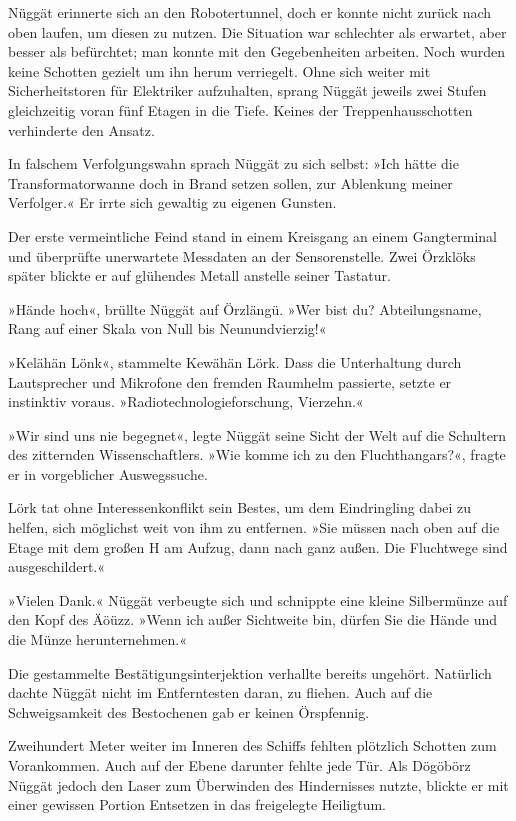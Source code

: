 Nüggät erinnerte sich an den Robotertunnel, doch er konnte nicht zurück nach oben laufen, um diesen zu nutzen. Die Situation war schlechter als erwartet, aber besser als befürchtet; man konnte mit den Gegebenheiten arbeiten. Noch wurden keine Schotten gezielt um ihn herum verriegelt. Ohne sich weiter mit Sicherheitstoren für Elektriker aufzuhalten, sprang Nüggät jeweils zwei Stufen gleichzeitig voran fünf Etagen in die Tiefe. Keines der Treppenhausschotten verhinderte den Ansatz.

In falschem Verfolgungswahn sprach Nüggät zu sich selbst: »Ich hätte die Transformatorwanne doch in Brand setzen sollen, zur Ablenkung meiner Verfolger.« Er irrte sich gewaltig zu eigenen Gunsten.

Der erste vermeintliche Feind stand in einem Kreisgang an einem Gangterminal und überprüfte unerwartete Messdaten an der Sensorenstelle. Zwei Örzklöks später blickte er auf glühendes Metall anstelle seiner Tastatur.

»Hände hoch«, brüllte Nüggät auf Örzlängü. »Wer bist du? Abteilungsname, Rang auf einer Skala von Null bis Neunundvierzig!«

»Kelähän Lönk«, stammelte Kewähän Lörk. Dass die Unterhaltung durch Lautsprecher und Mikrofone den fremden Raumhelm passierte, setzte er instinktiv voraus. »Radiotechnologieforschung, Vierzehn.«

»Wir sind uns nie begegnet«, legte Nüggät seine Sicht der Welt auf die Schultern des zitternden Wissenschaftlers. »Wie komme ich zu den Fluchthangars?«, fragte er in vorgeblicher Auswegssuche.

Lörk tat ohne Interessenkonflikt sein Bestes, um dem Eindringling dabei zu helfen, sich möglichst weit von ihm zu entfernen. »Sie müssen nach oben auf die Etage mit dem großen H am Aufzug, dann nach ganz außen. Die Fluchtwege sind ausgeschildert.«

»Vielen Dank.« Nüggät verbeugte sich und schnippte eine kleine Silbermünze auf den Kopf des Äöüzz. »Wenn ich außer Sichtweite bin, dürfen Sie die Hände und die Münze herunternehmen.«

Die gestammelte Bestätigungsinterjektion verhallte bereits ungehört. Natürlich dachte Nüggät nicht im Entferntesten daran, zu fliehen. Auch auf die Schweigsamkeit des Bestochenen gab er keinen Örspfennig.

Zweihundert Meter weiter im Inneren des Schiffs fehlten plötzlich Schotten zum Vorankommen. Auch auf der Ebene darunter fehlte jede Tür. Als Dögöbörz Nüggät jedoch den Laser zum Überwinden des Hindernisses nutzte, blickte er mit einer gewissen Portion Entsetzen in das freigelegte Heiligtum.

